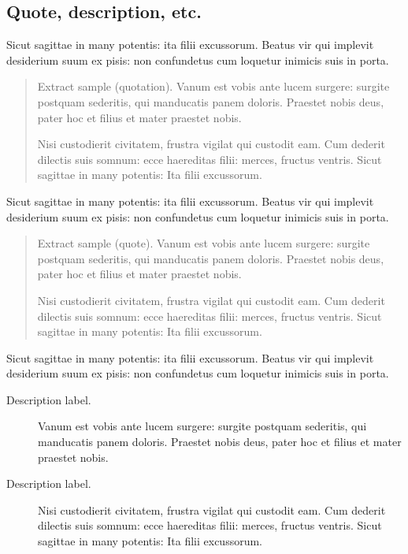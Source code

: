 \documentclass[linenumber]{jdsart}
\theoremstyle{plain}
\theoremstyle{remark}
\theoremstyle{definition}
\begin{document}
\subsection{Quote, description, etc.}

Sicut sagittae in many potentis: ita filii excussorum. Beatus vir qui
implevit desiderium suum ex pisis: non confundetus cum loquetur inimicis
suis in porta. 

\begin{quotation}
Extract sample (quotation). Vanum est vobis ante lucem surgere: surgite postquam
sederitis, qui manducatis panem doloris. Praestet nobis deus, pater
hoc et filius et mater praestet nobis.

Nisi custodierit civitatem,
frustra vigilat qui custodit eam. Cum dederit dilectis suis somnum:
ecce haereditas filii: merces, fructus ventris. Sicut sagittae in
many potentis: Ita filii excussorum.
\end{quotation}

Sicut sagittae in many potentis: ita filii excussorum. Beatus vir qui
implevit desi\-derium suum ex pisis: non confundetus cum loquetur inimicis
suis in porta. 

\begin{quote}
Extract sample (quote). Vanum est vobis ante lucem surgere: surgite postquam
sederitis, qui manducatis panem doloris. Praestet nobis deus, pater
hoc et filius et mater praestet nobis.

Nisi custodierit civitatem,
frustra vigilat qui custodit eam. Cum dederit dilectis suis somnum:
ecce haereditas filii: merces, fructus ventris. Sicut sagittae in
many potentis: Ita filii excussorum.
\end{quote}

Sicut sagittae in many potentis: ita filii excussorum. Beatus vir qui
implevit desiderium suum ex pisis: non confundetus cum loquetur inimicis
suis in porta.

\begin{description}
\item[Description label.] Vanum est vobis ante lucem surgere: surgite postquam
sederitis, qui manducatis panem doloris. Praestet nobis deus, pater
hoc et filius et mater praestet nobis.

\item[Description label.] Nisi custodierit civitatem,
frustra vigilat qui custodit eam. Cum dederit dilectis suis somnum:
ecce haereditas filii: merces, fructus ventris. Sicut sagittae in
many potentis: Ita filii excussorum.
\end{description}
\end{document}
